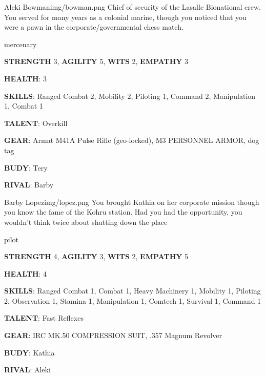 


\begin{rpg-pcbox}{Aleki Bowman}{img/bowman.png}
    Chief of security of the Lasalle Bionational crew. You served for many years as a colonial marine, though you noticed that you were a pawn in the corporate/governmental chess match.
\end{rpg-pcbox}

\begin{rpg-commentbox}{}
    mercenary

    \textbf{STRENGTH} 3, \textbf{AGILITY} 5, \textbf{WITS} 2, \textbf{EMPATHY} 3

    \textbf{HEALTH}: 3

    \textbf{SKILLS}: Ranged Combat 2, Mobility 2, Piloting 1, Command 2, Manipulation 1, Combat 1
    
    \textbf{TALENT}: Overkill
    
    \textbf{GEAR}: Armat M41A Pulse Rifle (geo-locked), M3 PERSONNEL ARMOR, dog tag

    \textbf{BUDY}: Tery
    
    \textbf{RIVAL}: Barby
\end{rpg-commentbox}

\newsect

\begin{rpg-pcbox}{Barby Lopez}{img/lopez.png}
    You brought Kathia on her corporate mission though you know the fame of the Kohru station. Had you had the opportunity, you wouldn't think twice about shutting down the place
\end{rpg-pcbox}

\begin{rpg-commentbox}{}
    pilot

    \textbf{STRENGTH} 4, \textbf{AGILITY} 3, \textbf{WITS} 2, \textbf{EMPATHY} 5

    \textbf{HEALTH}: 4

    \textbf{SKILLS}: Ranged Combat 1, Combat 1, Heavy Machinery 1, Mobility 1, Piloting 2, Observation 1, Stamina 1, Manipulation 1, Comtech 1, Survival 1, Command 1
    
    \textbf{TALENT}: Fast Reflexes
    
    \textbf{GEAR}: IRC MK.50 COMPRESSION SUIT, .357 Magnum Revolver

    \textbf{BUDY}: Kathia
    
    \textbf{RIVAL}: Aleki
\end{rpg-commentbox}


\newsect

